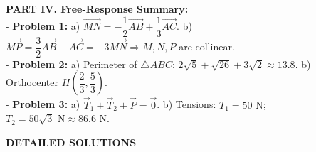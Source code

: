 \documentclass[10pt,a4paper]{article}
\begin{document}
\vspace{5pt}
\noindent\textbf{PART IV. Free-Response Summary:}\\[2pt]
- \textbf{Problem 1:} a) $\vec{MN} = -\dfrac{1}{2}\vec{AB} + \dfrac{1}{3}\vec{AC}$. b) $\vec{MP} = \dfrac{3}{2}\vec{AB} - \vec{AC} = -3\vec{MN} \Rightarrow M, N, P$ are collinear.\\
- \textbf{Problem 2:} a) Perimeter of $\triangle ABC$: $2\sqrt{5} + \sqrt{26} + 3\sqrt{2} \approx 13.8$. b) Orthocenter $H\left(\dfrac{2}{3}, \dfrac{5}{3}\right)$.\\
- \textbf{Problem 3:} a) $\vec{T}_1 + \vec{T}_2 + \vec{P} = \vec{0}$. b) Tensions: $T_1 = 50\text{ N}$; $T_2 = 50\sqrt{3}\text{ N} \approx 86.6\text{ N}$.

\vspace{4pt}
\begin{center}
  {\large\bfseries\color{ink} DETAILED SOLUTIONS}
\end{center}
\vspace{1pt}
\end{document}

